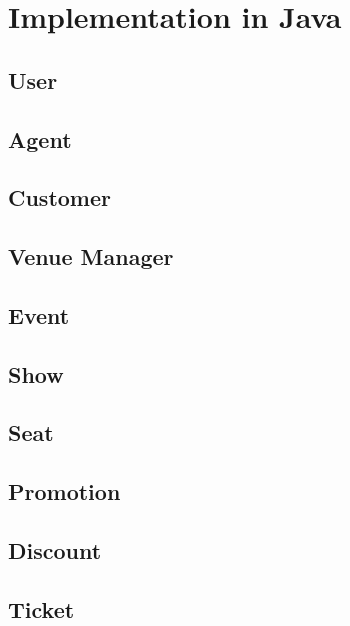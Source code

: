 \chapter{Implementation in Java}


\section{User}
\section{Agent}
\section{Customer}
\section{Venue Manager}

\section{Event}
\section{Show}
\section{Seat}

\section{Promotion}
\section{Discount}

\section{Ticket}
